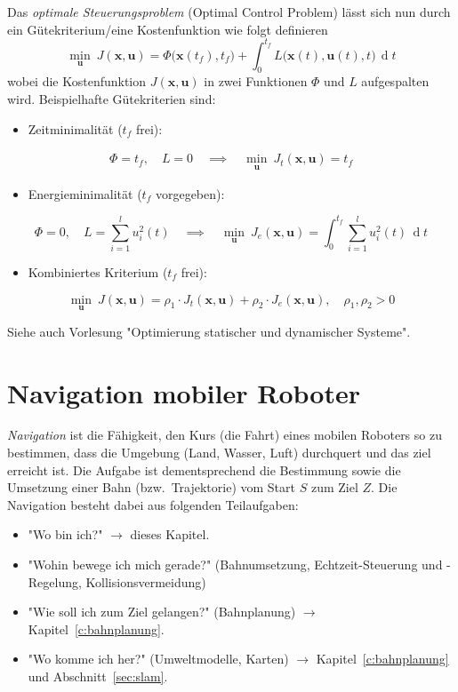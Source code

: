 \documentclass[a4paper, 11pt, accentcolor = tud3b]{tudreport}
\DeclareMathOperator{\total}{d}
\newcommand{\dif}[1]{\,\total#1}
\renewcommand{\vec}[1]{\boldsymbol{\mathbf{#1}}}
\newcommand{\bzw}{bzw.~}
\begin{document}
				Das \emph{optimale Steuerungsproblem} (Optimal Control Problem) lässt sich nun durch ein Gütekriterium/eine Kostenfunktion wie folgt definieren
				\begin{equation*}
					\min_{\vec{u}} \> J(\vec{x}, \vec{u}) = \Phi\big(\vec{x}(t_f), t_f\big) + \int_{0}^{t_f} \! L\big(\vec{x}(t), \vec{u}(t), t\big) \dif{t}
				\end{equation*}
				wobei die Kostenfunktion \( J(\vec{x}, \vec{u}) \) in zwei Funktionen \( \Phi \) und \( L \) aufgespalten wird. Beispielhafte Gütekriterien sind:
				\begin{itemize}
					\item Zeitminimalität (\(t_f\) frei):
				\end{itemize}
				\begin{gather*}
					\Phi = t_f,\quad L = 0 \quad\implies\quad \min_{\vec{u}} \> J_t(\vec{x}, \vec{u}) = t_f
				\end{gather*}
				\begin{itemize}
					\item Energieminimalität (\(t_f\) vorgegeben):
				\end{itemize}
				\begin{equation*}
					\Phi = 0,\quad L = \sum_{i = 1}^{l} u_i^2 (t) \quad\implies\quad \min_{\vec{u}} \> J_e(\vec{x}, \vec{u}) = \int_{0}^{t_f} \! \sum_{i = 1}^{l} u_i^2 (t) \dif{t}
				\end{equation*}
				\begin{itemize}
					\item Kombiniertes Kriterium (\(t_f\) frei):
				\end{itemize}
				\begin{equation*}
					\min_{\vec{u}} \> J(\vec{x}, \vec{u}) = \rho_1 \cdot J_t(\vec{x}, \vec{u}) + \rho_2 \cdot J_e(\vec{x}, \vec{u}),\quad \rho_1, \rho_2 > 0
				\end{equation*}
				
				Siehe auch Vorlesung "Optimierung statischer und dynamischer Systeme".

	\chapter{Navigation mobiler Roboter}
		\emph{Navigation} ist die Fähigkeit, den Kurs (die Fahrt) eines mobilen Roboters so zu bestimmen, dass die Umgebung (Land, Wasser, Luft) durchquert und das ziel erreicht ist. Die Aufgabe ist dementsprechend die Bestimmung sowie die Umsetzung einer Bahn (\bzw Trajektorie) vom Start \(S\) zum Ziel \(Z\). Die Navigation besteht dabei aus folgenden Teilaufgaben:
		\begin{itemize}
			\item "Wo bin ich?" \(\to\) dieses Kapitel.
			\item "Wohin bewege ich mich gerade?" (Bahnumsetzung, Echtzeit-Steuerung und -Regelung, Kollisionsvermeidung)
			\item "Wie soll ich zum Ziel gelangen?" (Bahnplanung) \(\to\) Kapitel~\ref{c:bahnplanung}.
			\item "Wo komme ich her?" (Umweltmodelle, Karten) \(\to\) Kapitel~\ref{c:bahnplanung} und Abschnitt~\ref{sec:slam}.
		\end{itemize}
\end{document}
